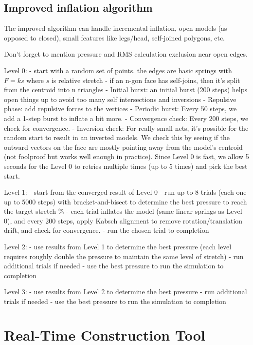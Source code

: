 \documentclass[letterpaper,11pt]{article}
\begin{document}
\subsection*{Improved inflation algorithm}

The improved algorithm can handle incremental inflation, open models (as opposed to closed), small features like legs/head, self-joined polygons, etc.

Don't forget to mention pressure and RMS calculation exclusion near open edges.

Level 0:
- start with a random set of points. the edges are basic springs with $F=ks$ where $s$ is relative stretch
- if an n-gon face has self-joins, then it's split from the centroid into n triangles
- Initial burst: an initial burst (200 steps) helps open things up to avoid too many self intersections and inversions
- Repulsive phase: add repulsive forces to the vertices
- Periodic burst: Every 50 steps, we add a 1-step burst to inflate a bit more.
- Convergence check: Every 200 steps, we check for convergence.
- Inversion check: For really small nets, it's possible for the random start to result in an inverted models. We check this by seeing if the outward vectors on the face are mostly pointing away from the model's centroid (not foolproof but works well enough in practice). Since Level 0 is fast, we allow 5 seconds for the Level 0 to retries multiple times (up to 5 times) and pick the best start.

Level 1:
- start from the converged result of Level 0
- run up to 8 trials (each one up to 5000 steps) with bracket-and-bisect to determine the best pressure to reach the target stretch \%
- each trial inflates the model (same linear springs as Level 0), and every 200 steps, apply Kabsch alignment to remove rotation/translation drift, and check for convergence.
- run the chosen trial to completion

Level 2:
- use results from Level 1 to determine the best pressure (each level requires roughly double the pressure to maintain the same level of stretch)
- run additional trials if needed
- use the best pressure to run the simulation to completion

Level 3:
- use results from Level 2 to determine the best pressure
- run additional trials if needed
- use the best pressure to run the simulation to completion

\section*{Real-Time Construction Tool}
\end{document}
